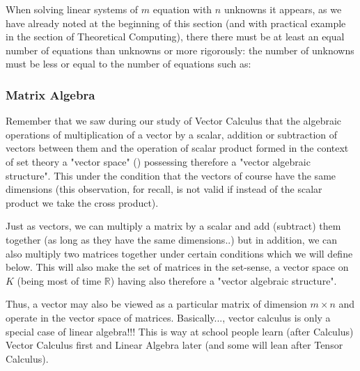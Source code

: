 	When solving linear systems of $m$ equation with $n$ unknowns it appears, as we have already noted at the beginning of this section (and with practical example in the section of Theoretical Computing), there there must be at least an equal number of equations than unknowns or more rigorously: the number of unknowns must be less or equal to the number of equations such as:
	
	
	\pagebreak
	\subsubsection{Matrix Algebra}
	Remember that we saw during our study of Vector Calculus that the algebraic operations of multiplication of a vector by a scalar, addition or subtraction of vectors between them and the operation of scalar product formed in the context of set theory a "vector space" () possessing therefore a "vector algebraic structure". This under the condition that the vectors of course have the same dimensions (this observation, for recall, is not valid if instead of the scalar product we take the cross product).
	
	Just as vectors, we can multiply a matrix by a scalar and add (subtract) them together (as long as they have the same dimensions..) but in addition, we can also multiply two matrices together under certain conditions which we will define below. This will also make the set of matrices in the set-sense, a vector space on $K$ (being most of time $\mathbb{R}$) having also therefore a "vector algebraic structure".
	
	Thus, a vector may also be viewed as a particular matrix of dimension $m\times n$  and operate in the vector space of matrices. Basically..., vector calculus is only a special case of linear algebra!!! This is way at school people learn (after Calculus) Vector Calculus first and Linear Algebra later (and some will lean after Tensor Calculus).
	
